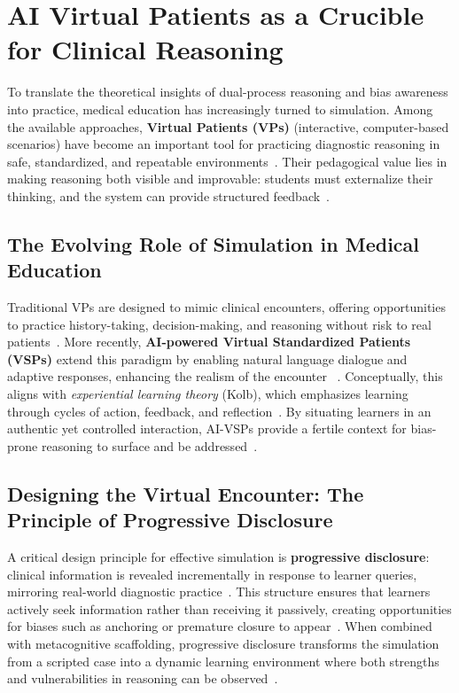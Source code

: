 \section{AI Virtual Patients as a Crucible for Clinical Reasoning}

To translate the theoretical insights of dual-process reasoning and bias awareness
into practice, medical education has increasingly turned to simulation. Among the
available approaches, \textbf{Virtual Patients (VPs)} (interactive, computer-based
scenarios) have become an important tool for practicing diagnostic reasoning in
safe, standardized, and repeatable environments~\parencite{Chan2019,Potter2024}.
Their pedagogical value lies in making reasoning both visible and improvable:
students must externalize their thinking, and the system can provide structured
feedback~\parencite{Sapci2020}.

\subsection{The Evolving Role of Simulation in Medical Education}

Traditional VPs are designed to mimic clinical encounters, offering opportunities
to practice history-taking, decision-making, and reasoning without risk to real
patients~\parencite{Potter2024}. More recently, \textbf{AI-powered Virtual
Standardized Patients (VSPs)} extend this paradigm by enabling natural language
dialogue and adaptive responses, enhancing the realism of the encounter
~\parencite{Chan2019,Lee2024}. Conceptually, this aligns with
\emph{experiential learning theory} (Kolb), which emphasizes learning through
cycles of action, feedback, and reflection~\parencite{book}. By situating learners
in an authentic yet controlled interaction, AI-VSPs provide a fertile context for
bias-prone reasoning to surface and be addressed~\parencite{Carl2023}.

\subsection{Designing the Virtual Encounter: The Principle of Progressive Disclosure}

A critical design principle for effective simulation is \textbf{progressive
disclosure}: clinical information is revealed incrementally in response to learner
queries, mirroring real-world diagnostic practice~\parencite{Iqbal2021}. This
structure ensures that learners actively seek information rather than receiving it
passively, creating opportunities for biases such as anchoring or premature closure
to appear~\parencite{graber_diagnostic_2005,croskerry_importance_2003}. When
combined with metacognitive scaffolding, progressive disclosure transforms the
simulation from a scripted case into a dynamic learning environment where both
strengths and vulnerabilities in reasoning can be observed~\parencite{mamede_structure_2004}.

